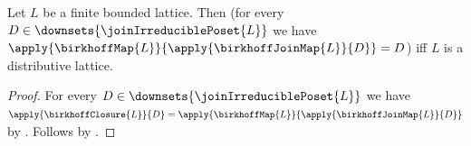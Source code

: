 \begin{theorem}\label{birkhoff_unit_identity_iff_distributive}
    Let $L$ be a finite bounded lattice.
    Then
        (for every $D\in\downsets{\joinIrreduciblePoset{L}}$ we have
            $\apply{\birkhoffMap{L}}
                {\apply{\birkhoffJoinMap{L}}{D}}=D$) iff
        $L$ is a distributive lattice.
\end{theorem}
\begin{proof}
    For every $D\in\downsets{\joinIrreduciblePoset{L}}$ we have
        $\apply{\birkhoffClosure{L}}{D}
            =\apply{\birkhoffMap{L}}
                {\apply{\birkhoffJoinMap{L}}{D}}$ by
        .
    Follows by .
\end{proof}
